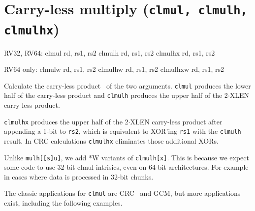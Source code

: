 %
%
%
%
%
%
%
%


\section{Carry-less multiply (\texttt{clmul, clmulh, clmulhx})}

\begin{rvb}
  RV32, RV64:
    clmul   rd, rs1, rs2
    clmulh  rd, rs1, rs2
    clmulhx rd, rs1, rs2

  RV64 only:
    clmulw   rd, rs1, rs2
    clmulhw  rd, rs1, rs2
    clmulhxw rd, rs1, rs2
\end{rvb}

Calculate the carry-less product~\cite{CarryLessProduct} of the two arguments. \texttt{clmul}
produces the lower half of the carry-less product and \texttt{clmulh} produces the upper half
of the 2$\cdot$XLEN carry-less product.

\texttt{clmulhx} produces the upper half of the 2$\cdot$XLEN carry-less product after appending
a 1-bit to {\tt rs2}, which is equivalent to XOR'ing {\tt rs1} with the {\tt clmulh} result.
In CRC calculations {\tt clmulhx} eliminates those additional XORs.

Unlike {\tt mulh[[s]u]}, we add *W variants of {\tt clmulh[x]}. This is because we expect
some code to use 32-bit clmul intrisics, even on 64-bit architectures. For example in cases
where data is processed in 32-bit chunks.



The classic applications for \texttt{clmul} are CRC~\cite{FastCRC,Wolf18A} and GCM, but more
applications exist, including the following examples.

